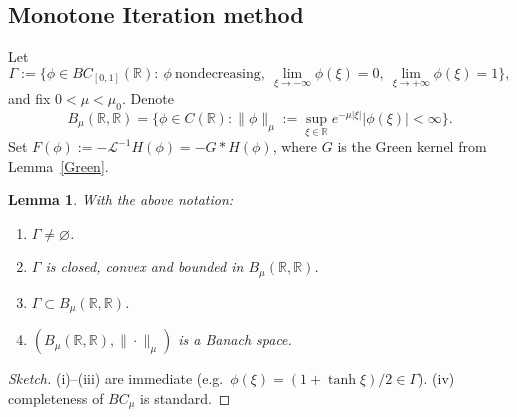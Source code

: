 \documentclass[12pt,letterpaper]{amsart}
\newtheorem{lemma}[theorem]{Lemma}
\theoremstyle{definition}
\theoremstyle{remark}
\numberwithin{equation}{section}
\begin{document}
% 	
% 	
% 	
% 	
% 
 
 \subsection{Monotone Iteration method}
  
 Let
 \[
 \Gamma := \Big\{ \phi \in BC_{[0,1]}(\mathbb{R}) :
 \ \phi\ \text{nondecreasing},\ 
 \lim_{\xi\to-\infty}\phi(\xi)=0,\ 
 \lim_{\xi\to+\infty}\phi(\xi)=1\Big\},
 \]
 and fix $0<\mu<\mu_0$. Denote
 \[
 B_\mu(\mathbb R, \mathbb R)=\{\phi\in C(\mathbb R):\|\phi\|_\mu:=\sup_{\xi\in\mathbb R} e^{-\mu|\xi|}|\phi(\xi)|<\infty\}.
 \]
 Set $F(\phi):=-\mathcal L^{-1}H(\phi)=-G*H(\phi)$, where $G$ is the Green kernel from Lemma~\ref{Green}.
 \begin{lemma}\label{Banach}
 	With the above notation:
 	\begin{enumerate}
 		\item $\Gamma\neq\varnothing$.
 		\item $\Gamma$ is closed, convex and bounded in $B_\mu(\mathbb R, \mathbb R)$.
 		\item $\Gamma\subset B_\mu(\mathbb R, \mathbb R)$.
 		\item $(B_\mu(\mathbb R, \mathbb R),\|\cdot\|_\mu)$ is a Banach space.
 	\end{enumerate}
 \end{lemma}
 \begin{proof}[Sketch]
 	(i)–(iii) are immediate (e.g.\ $\phi(\xi)=(1+\tanh\xi)/2\in\Gamma$). (iv) completeness of $BC_\mu$ is standard.
 \end{proof}
  
\end{document}
